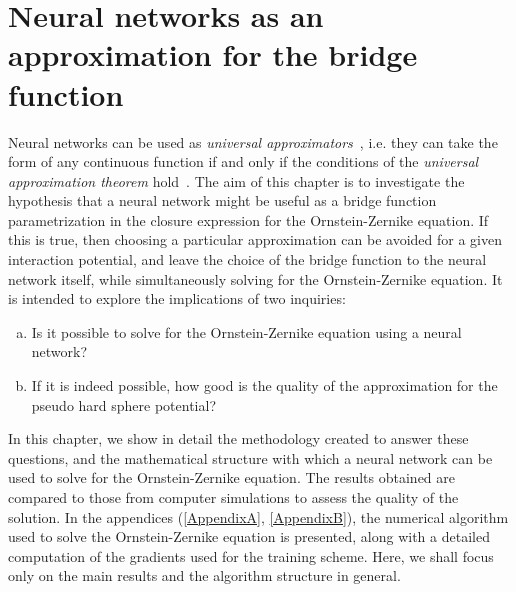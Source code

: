 \newcommand{\vecr}{\mathbf{r}}
\newcommand{\veck}{\mathbf{k}}
\newcommand{\nnet}{N_{\theta}(\mathbf{r})}
\def\Itemautorefname{Figure}
\chapter{Neural networks as an approximation for the bridge function}
\label{Cap3}


Neural networks can be used as \emph{universal approximators}~\cite{hornikMultilayerFeedforwardNetworks1989, hornikApproximationCapabilitiesMultilayer1991, cybenkoApproximationSuperpositionsSigmoidal1989},
i.e. they can take the form of any continuous function if and only if the conditions of the
\emph{universal approximation theorem} hold~\cite{parkMinimumWidthUniversal2020,zhouUniversalityDeepConvolutional2020}.
The aim of this chapter is to investigate the hypothesis that a neural network might be 
useful as a bridge function parametrization in the closure expression for the 
Ornstein-Zernike equation.
If this is true, then choosing a particular approximation can be avoided for a given 
interaction potential, and leave the choice of the bridge function to the neural network 
itself, while simultaneously solving for the Ornstein-Zernike equation. It is intended to
explore the implications of two inquiries:

\begin{enumerate}[(a)]
    \item Is it possible to solve for the Ornstein-Zernike equation using a neural network?
    \item If it is indeed possible, how good is the quality of the approximation for the pseudo hard sphere potential?
\end{enumerate}

In this chapter, we show in detail the methodology created to answer these questions, and
the mathematical structure with which a neural network can be used to solve for the
Ornstein-Zernike equation.
The results obtained are compared to those from computer simulations to assess the
quality of the solution.
In the appendices (\autoref{AppendixA}, \autoref{AppendixB}), the numerical algorithm used 
to solve the Ornstein-Zernike equation
is presented, along with a detailed computation of the gradients used for the
training scheme. Here, we shall focus only on the main results and the algorithm structure
in general.

